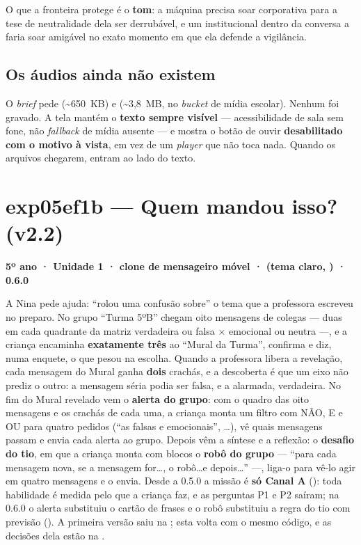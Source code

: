 O que a fronteira protege é o \textbf{tom}: a máquina precisa soar corporativa
para a tese de neutralidade dela ser derrubável, e um  institucional
dentro da conversa a faria soar amigável no exato momento em que ela defende a
vigilância.

\subsection{Os áudios ainda não existem}

O \emph{brief} pede  (\textasciitilde 650~KB) e
 (\textasciitilde 3,8~MB, no \emph{bucket} de mídia
escolar). Nenhum foi gravado. A tela mantém o \textbf{texto sempre visível} ---
acessibilidade de sala sem fone, não \emph{fallback} de mídia ausente --- e
mostra o botão de ouvir \textbf{desabilitado com o motivo à vista}, em vez de um
\emph{player} que não toca nada. Quando os arquivos chegarem, entram ao lado do
texto.

\section{exp05ef1b --- Quem mandou isso? (v2.2)}
\label{sec:exp05ef1b}

\textbf{5º ano · Unidade 1 · clone de mensageiro móvel · 
(tema claro, ) · 0.6.0}

A Nina pede ajuda: \enquote{rolou uma confusão sobre} o tema que a professora
escreveu no preparo. No grupo \enquote{Turma 5ºB} chegam oito mensagens de
colegas --- duas em cada quadrante da matriz verdadeira ou falsa $\times$
emocional ou neutra ---, e a criança encaminha \textbf{exatamente três} ao
\enquote{Mural da Turma}, confirma e diz, numa enquete, o que pesou na escolha.
Quando a professora libera a revelação, cada mensagem do Mural ganha
\textbf{dois} crachás, e a descoberta é que um eixo não prediz o outro: a
mensagem séria podia ser falsa, e a alarmada, verdadeira. No fim do Mural
revelado vem o \textbf{alerta do grupo}: com o quadro das oito mensagens e
os crachás de cada uma, a criança monta um filtro com NÃO, E e OU para
quatro pedidos (\enquote{as falsas e emocionais}, \ldots), vê quais
mensagens passam e envia cada alerta ao grupo. Depois vêm a síntese e a
reflexão: o \textbf{desafio do tio}, em que a criança monta com blocos o
\textbf{robô do grupo} --- \enquote{para cada mensagem nova, se a mensagem
for\ldots, o robô\ldots e depois\ldots} ---, liga-o para vê-lo agir em quatro
mensagens e o envia. Desde a 0.5.0 a missão é \textbf{só Canal A}
(): toda habilidade é medida pelo que a criança faz, e as
perguntas P1 e P2 saíram; na 0.6.0 o alerta substituiu o cartão de frases e
o robô substituiu a regra do tio com previsão (). A primeira versão saiu na
; esta volta com o mesmo código, e as decisões dela estão na
.

